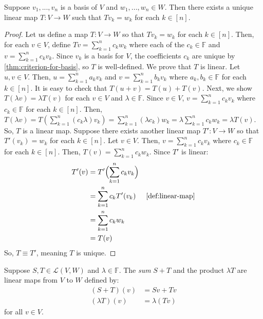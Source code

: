 \documentclass{article}
\begin{document}
\begin{lemma}
  \label{lemma:linear-map-lemma}
  Suppose $v_1, ..., v_n$ is a basis of $V$ and $w_1, ..., w_n \in
  W$. Then there exists a unique linear map $T: V \rightarrow W$ such
  that $Tv_k = w_k$ for each $k \in [n]$. 
\end{lemma}
\begin{proof}
  Let us define a map $T: V \rightarrow W$ so that $Tv_k = w_k$ for
  each $k \in [n]$. Then, for each $v \in V$, define $Tv =
  \sum_{k=1}^n c_k w_k$ where each of the  $c_k \in \mathbb{F}$ and $v
  = \sum_{k=1}^n c_k v_k$. Since $v_k$ is a basis for $V$, the
  coefficients $c_k$ are unique by \cref{thm:criterion-for-basis}, so
  $T$ is well-defined. We prove that $T$ is linear. Let $u, v \in
  V$. Then, $u = \sum_{k=1}^n a_k v_k$ and $v = \sum_{k=1}^n b_k v_k$
  where $a_k, b_k \in \mathbb{F}$ for each $k \in [n]$. It is easy to
  check that $T(u + v) = T(u) + T(v)$. Next, we show $T(\lambda v) =
  \lambda T(v)$ for each $v \in V$ and $\lambda \in \mathbb{F}$. Since
  $v \in V$, $v = \sum_{k=1}^n c_k v_k$ where $c_k \in \mathbb{F}$ for
  each $k \in [n]$. Then, $T(\lambda v) = T(\sum_{k=1}^n (c_k \lambda)
  v_k) = \sum_{k=1}^n (\lambda c_k) w_k = \lambda \sum_{k=1}^n c_k w_k
  = \lambda T(v)$. So, $T$ is a linear map. Suppose there exists
  another linear map $T': V \rightarrow W$ so that $T'(v_k) = w_k$ for
  each $k \in [n]$. Let $v \in V$. Then, $v = \sum_{k=1}^n c_k v_k$
  where $c_k \in \mathbb{F}$ for each $k \in [n]$. Then, $T(v) =
  \sum_{k=1}^n c_k w_k$. Since $T'$ is linear:
  \begin{align*}
    T'(v) &= T'\Bigl(  \sum_{k=1}^n c_k v_k \Bigr) \\
          &= \sum_{k=1}^n c_k T'(v_k) & \text{\cref{def:linear-map}} \\
          &= \sum_{k=1}^n c_k w_k \\
          &= T(v) \\
  \end{align*}
  So, $T \equiv T'$, meaning $T$ is unique. 
\end{proof}

\begin{definition}
  \label{def:addition-multiplication-on-LVW}
  Suppose $S, T \in \mathcal{L}(V, W)$ and $\lambda \in
  \mathbb{F}$. The \textit{sum} $S + T$ and the product $\lambda T$
  are linear maps from $V$ to $W$ defined by:
  \begin{align*}
    (S + T)(v) &= Sv + Tv \\
    (\lambda T)(v) &= \lambda(Tv)
  \end{align*}
  for all $v \in V$.
\end{definition}
\end{document}
